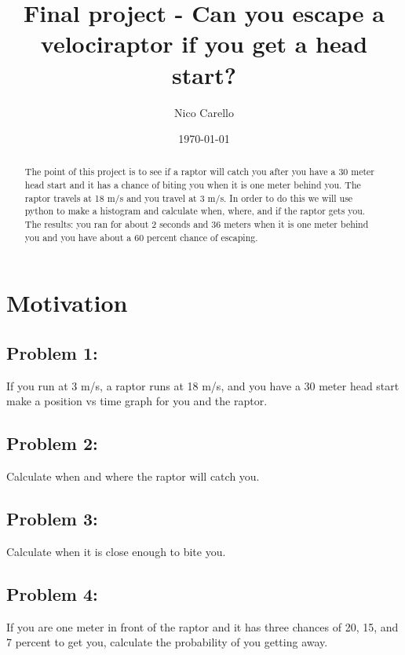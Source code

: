 \documentclass[twocolumn]{revtex4}
\begin{document}
\title{Final project - Can you escape a velociraptor if you get a head start?}

\author{Nico Carello}

\date{\today}

\begin{abstract}
    The point of this project is to see if a raptor will catch you after you have a 30 meter head start and it has a chance of biting you when it is one meter behind you. The raptor travels at 18 m/s and you travel at 3 m/s. In order to do this we will use python to make a histogram and calculate when, where, and if the raptor gets you. The results: you ran for  about 2 seconds and 36 meters when it is one meter behind you and you have about a 60 percent chance of escaping. 
\end{abstract}

\maketitle

\section{Motivation}
\subsection{Problem 1:} If you run at 3 m/s, a raptor runs at 18 m/s, and you have a 30 meter head start make a position vs time graph for you and the raptor.

\subsection{Problem 2:} Calculate when and where the raptor will catch you.

\subsection{Problem 3:} Calculate when it is close enough to bite you.

\subsection{Problem 4:} If you are one meter in front of the raptor and it has three chances of 20, 15, and 7 percent to get you, calculate the probability of you getting away.
\end{document}

